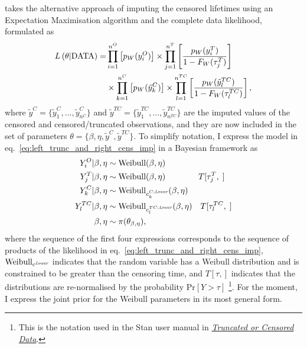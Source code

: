 \citet{mitra2013} takes the alternative approach of imputing the censored lifetimes using an Expectation Maximisation algorithm and the complete data likelihood, formulated as
\begin{align}
    \label{eq:left_trunc_and_right_cens_imp}
    L\left(\theta|\hbox{DATA}\right) = & 
    \prod^{n^O}_{i = 1}\left[p_W(y^O_i) \right] \times
    \prod^{n^T}_{j = 1}\left[\frac{p_W(y^T_i)}{1 - F_W(\tau^T_j)} \right] \\
    & \times \prod^{n^C}_{k = 1}\left[p_W(\tilde{y}^C_k)\right]
    \times \prod^{n^{TC}}_{l = 1}\left[\frac{p_W(\tilde{y}^{TC}_l)}{1 - F_W(\tau^{TC}_l)}\right] \nonumber,
\end{align}
where $\tilde{y}^C = \{\tilde{y}^C_1, \dots, \tilde{y}^C_{n^C}\}$ and $\tilde{y}^{TC} = \{\tilde{y}^{TC}_1, \dots, \tilde{y}^{TC}_{n^{TC}}\}$ are the imputed values of the censored and censored/truncated observations, and they are now included in the set of parameters $\theta = \{\beta, \eta, \tilde{y}^C, \tilde{y}^{TC}\}$. To simplify notation, I express the model in eq.~\eqref{eq:left_trunc_and_right_cens_imp} in a Bayesian framework as
\begin{align*}
    Y^O_i|\beta, \eta    & \sim \hbox{Weibull}(\beta, \eta) \\
    Y^T_j|\beta, \eta    & \sim \hbox{Weibull}(\beta, \eta) \qquad \qquad T[\tau^T_j, \;]\\
    Y^C_k|\beta, \eta    & \sim \hbox{Weibull}_{c^{C;\textit{\tiny{Lower}}}_k}(\beta, \eta) \\
    Y^{TC}_l|\beta, \eta & \sim \hbox{Weibull}_{c^{TC;\textit{\tiny{Lower}}}_l}(\beta, \eta) \quad T[\tau^{TC}_l, \;] \\
    \beta, \eta & \sim \pi(\theta_{\beta, \eta}),
\end{align*}
where the sequence of the first four expressions corresponds to the sequence of products of the likelihood in eq.~\eqref{eq:left_trunc_and_right_cens_imp}, $\hbox{Weibull}_{c^{\textit{\tiny{Lower}}}}$ indicates that the random variable has a Weibull distribution and is constrained to be greater than the censoring time, and $T[\tau, ]$ indicates that the distributions are re-normalised by the probability $\text{Pr}\left[Y > \tau\right]$ \citep{Stan2022} \footnote{This is the notation used in the Stan user manual in \href{https://mc-stan.org/docs/stan-users-guide/truncation-censoring.html}{\textit{Truncated or Censored Data}}.}. For the moment, I express the joint prior for the Weibull parameters in its most general form.

